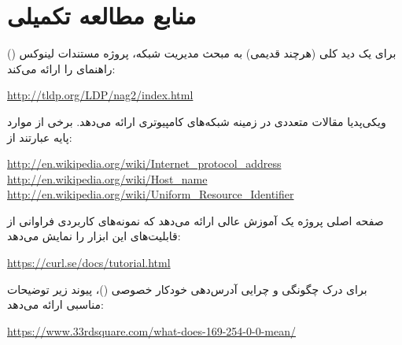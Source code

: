 \section{منابع مطالعه تکمیلی}

برای یک دید کلی (هرچند قدیمی) به مبحث مدیریت شبکه، پروژه مستندات لینوکس () راهنمای  را ارائه می‌کند:

\begin{latin}
\url{http://tldp.org/LDP/nag2/index.html}
\end{latin}

ویکی‌پدیا مقالات متعددی در زمینه شبکه‌های کامپیوتری ارائه می‌دهد. برخی از موارد پایه عبارتند از:

\begin{latin}
\url{http://en.wikipedia.org/wiki/Internet_protocol_address}\\
\url{http://en.wikipedia.org/wiki/Host_name}\\
\url{http://en.wikipedia.org/wiki/Uniform_Resource_Identifier}
\end{latin}

صفحه اصلی پروژه  یک آموزش عالی ارائه می‌دهد که نمونه‌های کاربردی فراوانی از قابلیت‌های این ابزار را نمایش می‌دهد:

\begin{latin}
\url{https://curl.se/docs/tutorial.html}
\end{latin}

برای درک چگونگی و چرایی آدرس‌دهی خودکار  خصوصی ()، پیوند زیر توضیحات مناسبی ارائه می‌دهد:

\begin{latin}
\url{https://www.33rdsquare.com/what-does-169-254-0-0-mean/}
\end{latin}